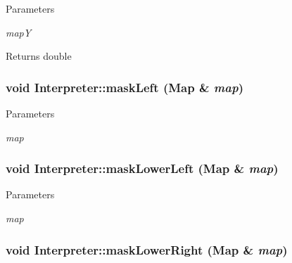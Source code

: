 \begin{DoxyParams}{Parameters}
\item[{\em mapY}]\end{DoxyParams}
\begin{DoxyReturn}{Returns}
double 
\end{DoxyReturn}
\hypertarget{classInterpreter_a454e31b3c1d0640be317c82c8b1b659d}{
\subsubsection[{maskLeft}]{\setlength{\rightskip}{0pt plus 5cm}void Interpreter::maskLeft ({\bf Map} \& {\em map})}}
\label{classInterpreter_a454e31b3c1d0640be317c82c8b1b659d}

\begin{DoxyParams}{Parameters}
\item[{\em map}]\end{DoxyParams}
\hypertarget{classInterpreter_af02271dded17efbe47316706aad115f7}{
\subsubsection[{maskLowerLeft}]{\setlength{\rightskip}{0pt plus 5cm}void Interpreter::maskLowerLeft ({\bf Map} \& {\em map})}}
\label{classInterpreter_af02271dded17efbe47316706aad115f7}

\begin{DoxyParams}{Parameters}
\item[{\em map}]\end{DoxyParams}
\hypertarget{classInterpreter_a5bafd4ac63cb3dee9a6ddff172a0df02}{
\subsubsection[{maskLowerRight}]{\setlength{\rightskip}{0pt plus 5cm}void Interpreter::maskLowerRight ({\bf Map} \& {\em map})}}
\label{classInterpreter_a5bafd4ac63cb3dee9a6ddff172a0df02}


